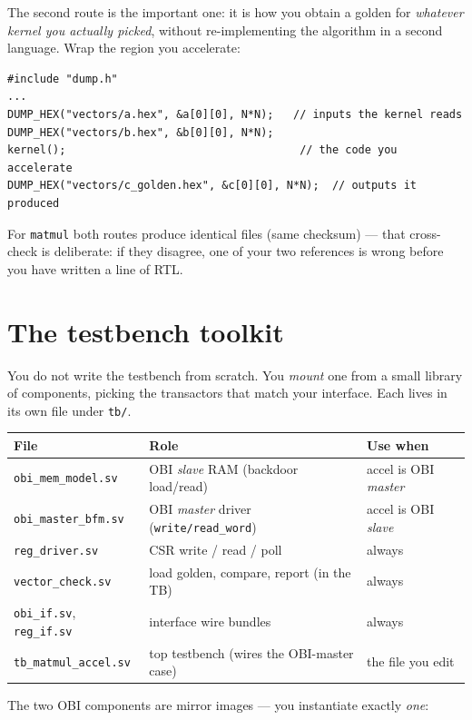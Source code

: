\documentclass[11pt]{article}
\newcommand{\code}[1]{\texttt{#1}}
\begin{document}
The second route is the important one: it is how you obtain a golden for
\emph{whatever kernel you actually picked}, without re-implementing the
algorithm in a second language. Wrap the region you accelerate:

\begin{lstlisting}[style=clisting]
#include "dump.h"
...
DUMP_HEX("vectors/a.hex", &a[0][0], N*N);   // inputs the kernel reads
DUMP_HEX("vectors/b.hex", &b[0][0], N*N);
kernel();                                    // the code you accelerate
DUMP_HEX("vectors/c_golden.hex", &c[0][0], N*N);  // outputs it produced
\end{lstlisting}

For \code{matmul} both routes produce identical files (same checksum) --- that
cross-check is deliberate: if they disagree, one of your two references is
wrong before you have written a line of RTL.

\section{The testbench toolkit}

You do not write the testbench from scratch. You \emph{mount} one from a small
library of components, picking the transactors that match your interface. Each
lives in its own file under \code{tb/}.

\begin{center}
\small
\begin{tabular}{@{}llp{6.3cm}@{}}
\toprule
File & Role & Use when \\
\midrule
\code{obi\_mem\_model.sv}  & OBI \emph{slave} RAM (backdoor load/read) & accel is OBI \emph{master} \\
\code{obi\_master\_bfm.sv} & OBI \emph{master} driver (\code{write/read\_word}) & accel is OBI \emph{slave} \\
\code{reg\_driver.sv}      & CSR write / read / poll & always \\
\code{vector\_check.sv}    & load golden, compare, report (in the TB) & always \\
\code{obi\_if.sv}, \code{reg\_if.sv} & interface wire bundles & always \\
\code{tb\_matmul\_accel.sv} & top testbench (wires the OBI-master case) & the file you edit \\
\bottomrule
\end{tabular}
\end{center}

The two OBI components are mirror images --- you instantiate exactly \emph{one}:
\end{document}
